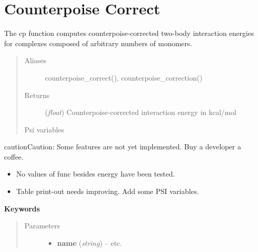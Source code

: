 \documentclass[letterpaper,10pt,english]{sphinxmanual}
\begin{document}
\chapter{Counterpoise Correct}
\label{index:counterpoise-correct}

\begin{fulllineitems}
\label{index:wrappers.cp}
The cp function computes counterpoise-corrected two-body interaction energies
for complexes composed of arbitrary numbers of monomers.
\begin{quote}\begin{description}
\item[{Aliases }] \leavevmode
counterpoise\_correct(), counterpoise\_correction()

\item[{Returns}] \leavevmode
(\emph{float}) Counterpoise-corrected interaction energy in kcal/mol

\item[{Psi variables}] \leavevmode
\end{description}\end{quote}

\begin{fulllineitems}
\label{index:envvar-CP-CORRECTED2-BODYINTERACTIONENERGY}\label{index:envvar-UNCP-CORRECTED2-BODYINTERACTIONENERGY}
\end{fulllineitems}


\begin{notice}{caution}{Caution:}
Some features are not yet implemented. Buy a developer a coffee.
\begin{itemize}
\item {} 
No values of func besides energy have been tested.

\item {} 
Table print-out needs improving. Add some PSI variables.

\end{itemize}
\end{notice}

\textbf{Keywords}
\begin{quote}\begin{description}
\item[{Parameters}] \leavevmode\begin{itemize}
\item {} 
\textbf{name} (\emph{string}) -- 
 \textbar{}\textbar{}  \textbar{}\textbar{} etc.


\end{itemize}
\end{description}
\end{quote}
\end{fulllineitems}
\end{document}
